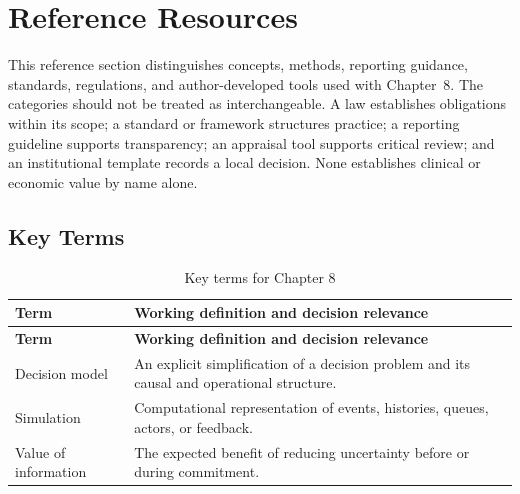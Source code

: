 \section{Reference Resources}
\label{sec:comp-ch08-reference}

This reference section distinguishes concepts, methods, reporting guidance,
standards, regulations, and author-developed tools used with Chapter~8. The
categories should not be treated as interchangeable. A law establishes obligations
within its scope; a standard or framework structures practice; a reporting guideline
supports transparency; an appraisal tool supports critical review; and an
institutional template records a local decision. None establishes clinical or
economic value by name alone. 

\subsection{Key Terms}
\begin{longtable}{@{}p{}p{}@{}}
\caption{Key terms for Chapter 8}
\label{tab:comp-ch08-key-terms}\\
\toprule
\textbf{Term} & \textbf{Working definition and decision relevance} \\
\midrule
\endfirsthead
\toprule
\textbf{Term} & \textbf{Working definition and decision relevance} \\
\midrule
\endhead
\bottomrule
\endlastfoot
Decision model & An explicit simplification of a decision problem and its causal and operational structure. \\
Simulation & Computational representation of events, histories, queues, actors, or feedback. \\
Value of information & The expected benefit of reducing uncertainty before or during commitment. \\
\end{longtable}

